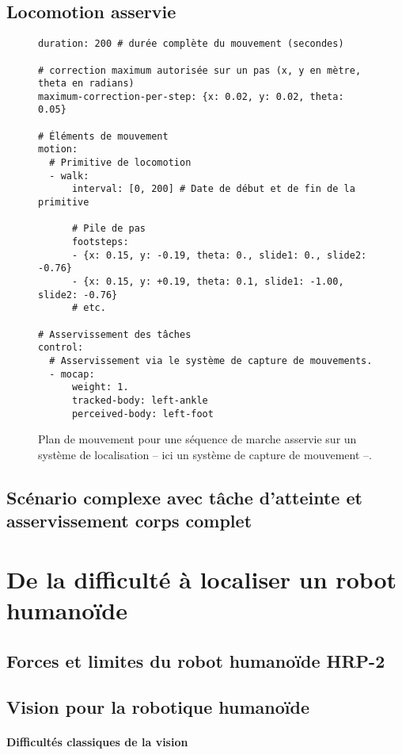 \subsection{Locomotion asservie}

\begin{figure}
  \begin{center}
\begin{verbatim}
duration: 200 # durée complète du mouvement (secondes)

# correction maximum autorisée sur un pas (x, y en mètre, theta en radians)
maximum-correction-per-step: {x: 0.02, y: 0.02, theta: 0.05}

# Éléments de mouvement
motion:
  # Primitive de locomotion
  - walk:
      interval: [0, 200] # Date de début et de fin de la primitive

      # Pile de pas
      footsteps:
      - {x: 0.15, y: -0.19, theta: 0., slide1: 0., slide2: -0.76}
      - {x: 0.15, y: +0.19, theta: 0.1, slide1: -1.00, slide2: -0.76}
      # etc.

# Asservissement des tâches
control:
  # Asservissement via le système de capture de mouvements.
  - mocap:
      weight: 1.
      tracked-body: left-ankle
      perceived-body: left-foot
\end{verbatim}
  \end{center}
  \caption{Plan de mouvement pour une séquence de marche asservie sur
    un système de localisation -- ici un système de capture de
    mouvement --.}
\end{figure}


\subsection{Scénario complexe avec tâche d'atteinte et asservissement corps complet}

\section{De la difficulté à localiser un robot humanoïde}
\subsection{Forces et limites du robot humanoïde HRP-2}
\subsection{Vision pour la robotique humanoïde}
\paragraph{Difficultés classiques de la vision}
